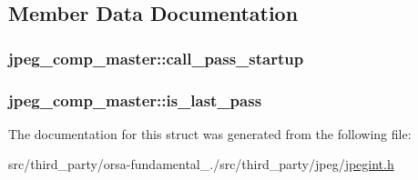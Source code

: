 \subsection{Member Data Documentation}
\hypertarget{structjpeg__comp__master_a72c70556604030b6b10d798f6c193e6f}{}
\subsubsection[{call\+\_\+pass\+\_\+startup}]{ jpeg\+\_\+comp\+\_\+master\+::call\+\_\+pass\+\_\+startup}\label{structjpeg__comp__master_a72c70556604030b6b10d798f6c193e6f}
\hypertarget{structjpeg__comp__master_aac35b3d9e718376d1aacdde9df32e75d}{}
\subsubsection[{is\+\_\+last\+\_\+pass}]{ jpeg\+\_\+comp\+\_\+master\+::is\+\_\+last\+\_\+pass}\label{structjpeg__comp__master_aac35b3d9e718376d1aacdde9df32e75d}


The documentation for this struct was generated from the following file\+:\begin{DoxyCompactItemize}
\item 
src/third\+\_\+party/orsa-\/fundamental\+\_./src/third\+\_\+party/jpeg/\hyperlink{jpegint_8h}{jpegint.\+h}\end{DoxyCompactItemize}
